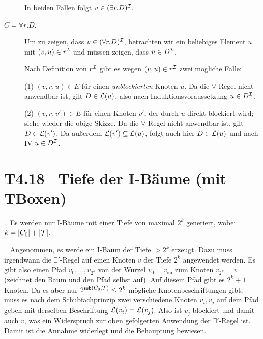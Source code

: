 \documentclass[fontsize=11pt, twoside=false, numbers=autoenddot]{scrbook}
\begin{document}
\begin{description}
{
      
      }
      
      In beiden Fällen folgt $v \in (\exists r.D)^\mathcal{I}$.
      
    \item[{\boldmath $C = \forall r.D$.}]
      Um zu zeigen, dass $v \in (\forall r.D)^\mathcal{I}$,
      betrachten wir ein beliebiges Element $u$ mit $(v,u) \in r^\mathcal{I}$
      und müssen zeigen, dass $u \in D^\mathcal{I}$.
      
      Nach Definition von $r^\mathcal{I}$ gibt es wegen $(v,u) \in r^\mathcal{I}$ zwei mögliche Fälle:
      
      (1) $(v,r,u) \in E$ für einen \emph{unblockierten} Knoten $u$.
      Da die $\forall$-Regel nicht anwendbar ist, gilt $D \in \mathcal{L}(u)$,
      also nach Induktionsvoraussetzung $u \in D^\mathcal{I}$.
      
      (2) $(v,r,v') \in E$ für einen Knoten $v'$, der durch $u$ direkt blockiert wird;
      siehe wieder die obige Skizze.
      Da die $\forall$-Regel nicht anwendbar ist, gilt $D \in \mathcal{L}(v')$.
      Da außerdem $\mathcal{L}(v') \subseteq \mathcal{L}(u)$, folgt auch hier $D \in \mathcal{L}(u)$
      und nach IV $u \in D^\mathcal{I}$.
      \qedhere
  \end{description}

\section*{T4.18~ Tiefe der I-Bäume (mit TBoxen)}

~
Es werden nur I-Bäume mit einer Tiefe von maximal $2^k$ generiert,
wobei $k = |C_0| + |\mathcal{T}|$.

\par\medskip
{}~
Angenommen, es werde ein I-Baum der Tiefe $>2^k$ erzeugt.
Dazu muss irgendwann die $\exists'$-Regel auf einen Knoten $v$ der Tiefe $2^k$
angewendet werden.
Es gibt also einen Pfad $v_0,\dots,v_{2^k}$ von der Wurzel $v_0 = v_{\textsf{ini}}$
zum Knoten $v_{2^k} = v$ (zeichnet den Baum und den Pfad selbst auf).
Auf diesem Pfad gibt es $2^k+1$ Knoten.
Da es aber nur $2^{\textsf{sub}(C_0,\mathcal{T})} \leq 2^k$ mögliche Knotenbeschriftungen gibt,
muss es nach dem Schubfachprinzip zwei verschiedene Knoten $v_i,v_j$ auf dem Pfad geben
mit derselben Beschriftung $\mathcal{L}(v_i) = \mathcal{L}(v_j)$.
Also ist $v_j$ blockiert und damit auch $v$,
was ein Widerspruch zur oben gefolgerten Anwendung der $\exists'$-Regel ist.
Damit ist die Annahme widerlegt und die Behauptung bewiesen.
\qedhere
\end{document}
